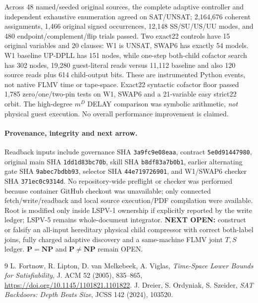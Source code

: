 \documentclass{article}
\begin{document}
Across 48 named/seeded original sources, the complete adaptive controller and independent exhaustive enumeration agreed on SAT/UNSAT; 2,164,676 coherent assignments, 1,466 original signed occurrences, 12,148 SS/SU/US/UU modes, and 480 endpoint/complement/flip trials passed. Two exact22 controls have 15 original variables and 20 clauses: W1 is UNSAT, SWAP6 has exactly 54 models. W1 baseline UP-DPLL has 151 nodes, while one-step both-child cofactor search has 302 nodes, 19,280 guest-literal reads versus 11,112 baseline and also 120 source reads plus 614 child-output bits. These are instrumented Python events, not native FLMV time or tape-space. Exact22 syntactic cofactor floor passed 1,785 zero/one/two-pin tests on W1, SWAP6 and a 21-variable easy strict22 orbit. The high-degree \(m^D\) DELAY comparison was symbolic arithmetic, \emph{not} physical guest execution. No overall performance improvement is claimed.

\paragraph{Provenance, integrity and next arrow.}
Readback inputs include governance SHA \texttt{3a9fc9e08eaa}, contract \texttt{5e0d91447980}, original main SHA \texttt{1dd1d83bc70b}, skill SHA \texttt{b8df83a7b0b1}, earlier alternating gate SHA \texttt{9abec7bdbb93}, selector SHA \texttt{44e719726901}, and W1/SWAP6 checker SHA \texttt{371ec0c9314d}. No repository-wide preflight or checker was performed because container GitHub checkout was unavailable; only connected fetch/write/readback and local source execution/PDF compilation were available. Root is modified only inside LSPV-1 ownership if explicitly reported by the write ledger; LSPV-5 remains whole-document integrator.
\textbf{NEXT OPEN:} construct or falsify an all-input hereditary physical child compressor with correct both-label joins, fully charged adaptive discovery and a same-machine FLMV joint \(T,S\) ledger. \(\mathbf{P=NP}\) and \(\mathbf{P\ne NP}\) remain OPEN.
\begin{thebibliography}{9}
 L. Fortnow, R. Lipton, D. van Melkebeek, A. Viglas, \emph{Time-Space Lower Bounds for Satisfiability}, J. ACM 52 (2005), 835--865, \url{https://doi.org/10.1145/1101821.1101822}.
 J. Dreier, S. Ordyniak, S. Szeider, \emph{SAT Backdoors: Depth Beats Size}, JCSS 142 (2024), 103520.
\end{thebibliography}
\end{document}
